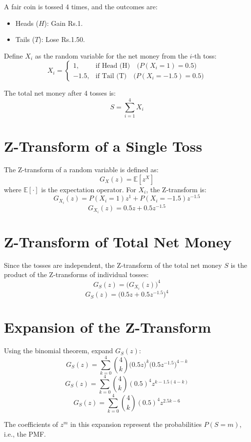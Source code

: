 \documentclass[journal]{IEEEtran}
\numberwithin{equation}{enumi}
\numberwithin{figure}{enumi}
\begin{document}
A fair coin is tossed 4 times, and the outcomes are:
\begin{itemize}
    \item Heads (\(H\)): Gain Rs.1.
    \item Tails (\(T\)): Lose Rs.1.50.
\end{itemize}

Define \(X_i\) as the random variable for the net money from the \(i\)-th toss:
\[
X_i =
\begin{cases}
1, & \text{if Head (H)} \quad \big(P(X_i = 1) = 0.5\big) \\
-1.5, & \text{if Tail (T)} \quad \big(P(X_i = -1.5) = 0.5\big)
\end{cases}
\]

The total net money after 4 tosses is:
\[
S = \sum_{i=1}^4 X_i
\]

\section*{Z-Transform of a Single Toss}

The Z-transform of a random variable is defined as:
\[
G_X(z) = \mathbb{E}[z^X]
\]
where \(\mathbb{E}[\cdot]\) is the expectation operator. For \(X_i\), the Z-transform is:
\[
G_{X_i}(z) = P(X_i = 1)z^1 + P(X_i = -1.5)z^{-1.5}
\]
\[
G_{X_i}(z) = 0.5z + 0.5z^{-1.5}
\]

\section*{Z-Transform of Total Net Money}

Since the tosses are independent, the Z-transform of the total net money \(S\) is the product of the Z-transforms of individual tosses:
\[
G_S(z) = \big(G_{X_i}(z)\big)^4
\]
\[
G_S(z) = \big(0.5z + 0.5z^{-1.5}\big)^4
\]

\section*{Expansion of the Z-Transform}

Using the binomial theorem, expand \(G_S(z)\):
\[
G_S(z) = \sum_{k=0}^4 \binom{4}{k} \big(0.5z\big)^k \big(0.5z^{-1.5}\big)^{4-k}
\]
\[
G_S(z) = \sum_{k=0}^4 \binom{4}{k} (0.5)^4 z^{k - 1.5(4-k)}
\]
\[
G_S(z) = \sum_{k=0}^4 \binom{4}{k} (0.5)^4 z^{2.5k - 6}
\]

The coefficients of \(z^m\) in this expansion represent the probabilities \(P(S = m)\), i.e., the PMF.
\end{document}
